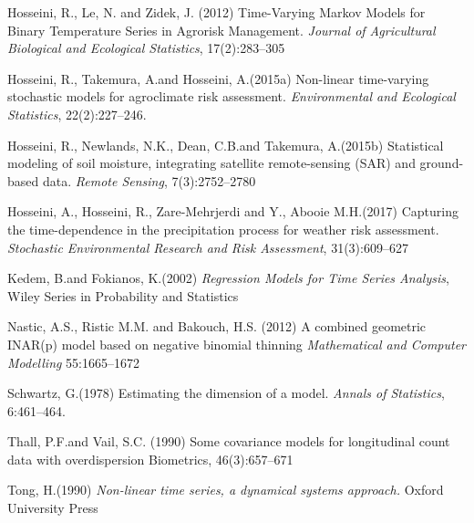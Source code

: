 \documentclass[11pt,twoside,openany]{article}
\begin{document}
\begin{thebibliography}{99}
Hosseini, R., Le, N. and Zidek, J. (2012)
\newblock Time-Varying Markov Models for Binary Temperature Series in Agrorisk Management.
\newblock \emph{Journal of Agricultural Biological and Ecological Statistics},  17(2):283--305

Hosseini, R., Takemura, A.\;and Hosseini, A.\;(2015a)
\newblock Non-linear time-varying stochastic models for agroclimate risk assessment.
\newblock \emph{Environmental and Ecological Statistics}, 22(2):227--246.

Hosseini, R., Newlands, N.\;K., Dean, C.\;B.\;and Takemura, A.\;(2015b)
\newblock Statistical modeling of soil moisture, integrating satellite remote-sensing (SAR) and ground-based data.
\newblock \emph{Remote Sensing}, 7(3):2752--2780

Hosseini, A., Hosseini, R., Zare-Mehrjerdi and Y., Abooie M.\;H.\;(2017)
\newblock Capturing the time-dependence in the precipitation process for weather risk assessment.
\newblock \emph{Stochastic Environmental Research and Risk Assessment}, 31(3):609--627

Kedem, B.\;and Fokianos, K.\;(2002)
\newblock \emph{Regression Models for Time Series Analysis},
\newblock Wiley Series in Probability and Statistics

Nastic, A.\;S.,  Ristic M.\;M. and Bakouch, H.\;S. (2012)
\newblock A combined geometric INAR(p) model based on negative binomial thinning
\newblock \emph{Mathematical and Computer Modelling} 55:1665--1672


Schwartz, G.\;(1978)
\newblock Estimating the dimension of a model.
\newblock \emph{Annals of Statistics}, 6:461--464.

Thall, P.\;F.\;and Vail, S.\;C. (1990)
\newblock Some covariance models for longitudinal count data with overdispersion
\newblock Biometrics, 46(3):657--671

Tong, H.\;(1990)
\newblock \emph{Non-linear time series, a dynamical systems approach.}
\newblock Oxford University Press


\end{thebibliography}
\end{document}
